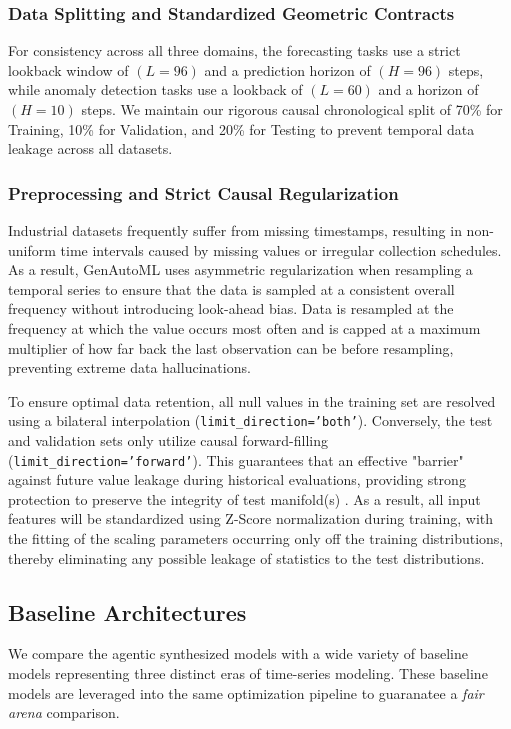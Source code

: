\documentclass{article}
\begin{document}
\subsubsection{Data Splitting and Standardized Geometric Contracts}
For consistency across all three domains, the forecasting tasks use a strict lookback window of $(L=96)$ and a prediction horizon of $(H=96)$ steps, while anomaly detection tasks use a lookback of $(L=60)$ and a horizon of $(H=10)$ steps. We maintain our rigorous causal chronological split of 70\% for Training, 10\% for Validation, and 20\% for Testing to prevent temporal data leakage across all datasets.

\subsubsection{Preprocessing and Strict Causal Regularization}
Industrial datasets frequently suffer from missing timestamps, resulting in non-uniform time intervals caused by missing values or irregular collection schedules. As a result, GenAutoML uses asymmetric regularization when resampling a temporal series to ensure that the data is sampled at a consistent overall frequency without introducing look-ahead bias. Data is resampled at the frequency at which the value occurs most often and is capped at a maximum multiplier of how far back the last observation can be before resampling, preventing extreme data hallucinations. 

To ensure optimal data retention, all null values in the training set are resolved using a bilateral interpolation (\texttt{limit\_direction='both'}). Conversely, the test and validation sets only utilize causal forward-filling (\texttt{limit\_direction='forward'}). This guarantees that an effective "barrier" against future value leakage during historical evaluations, providing strong protection to preserve the integrity of test manifold(s) \cite{kaufman2011leakage}. As a result, all input features will be standardized using Z-Score normalization during training, with the fitting of the scaling parameters occurring only off the training distributions, thereby eliminating any possible leakage of statistics to the test distributions.

\subsection{Baseline Architectures}
We compare the agentic synthesized models with a wide variety of baseline models representing three distinct eras of time-series modeling. 
These baseline models are leveraged into the same optimization pipeline to guaranatee a \textit{fair arena} comparison.
\end{document}
